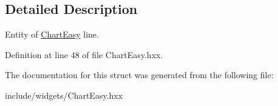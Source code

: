 \subsection{Detailed Description}
Entity of \mbox{\hyperlink{classeven_1_1_chart_easy}{Chart\+Easy}} line. 

Definition at line 48 of file Chart\+Easy.\+hxx.



The documentation for this struct was generated from the following file\+:\begin{DoxyCompactItemize}
\item 
include/widgets/Chart\+Easy.\+hxx\end{DoxyCompactItemize}
